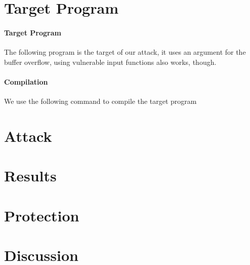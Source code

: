 \documentclass[journal=tosc,submission]{iacrtrans}
\begin{document}
\section{Target Program}
\paragraph{Target Program}
The following program is the target of our attack, it uses an argument for the buffer overflow, using vulnerable input functions also works, though.

\paragraph{Compilation}
We use the following command to compile the target program

\section{Attack}

\section{Results}

\section{Protection}

\section{Discussion}



\end{document}
